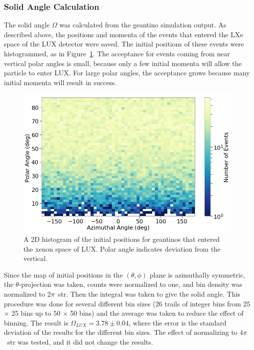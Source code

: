 \subsubsection{Solid Angle Calculation}
The solid angle $\Omega$ was calculated from the geantino simulation output. As described above, the positions and momenta of the events that entered the \ac{LXe} space of the \ac{LUX} detector were saved. The initial positions of these events were histogrammed, as in Figure~\ref{fig:skymap}. The acceptance for events coming from near vertical polar angles is small, because only a few initial momenta will allow the particle to enter \ac{LUX}. For large polar angles, the acceptance grows because many initial momenta will result in success. 

\begin{figure}[htbp]
\begin{center}
\includegraphics[width=\textwidth]{figures/lips/skymap.png}
\caption{A 2D histogram of the initial positions for geantinos that entered the xenon space of \acs{LUX}. Polar angle indicates deviation from the vertical. }
\label{fig:skymap}
\end{center}
\end{figure}

Since the map of initial positions in the $(\theta, \phi)$ plane is azimuthally symmetric, the $\theta$-projection was taken, counts were normalized to one, and bin density was normalized to $2\pi$~str. Then the integral was taken to give the solid angle. This procedure was done for several different bin sizes (26 trails of integer bins from 25 $\times$ 25 bins up to 50 $\times$ 50 bins) and the average was taken to reduce the effect of binning. The result is $\Omega_{LUX} = 3.78 \pm 0.04$, where the error is the standard deviation of the results for the different bin sizes. The effect of normalizing to $4\pi$~str was tested, and it did not change the results. 

